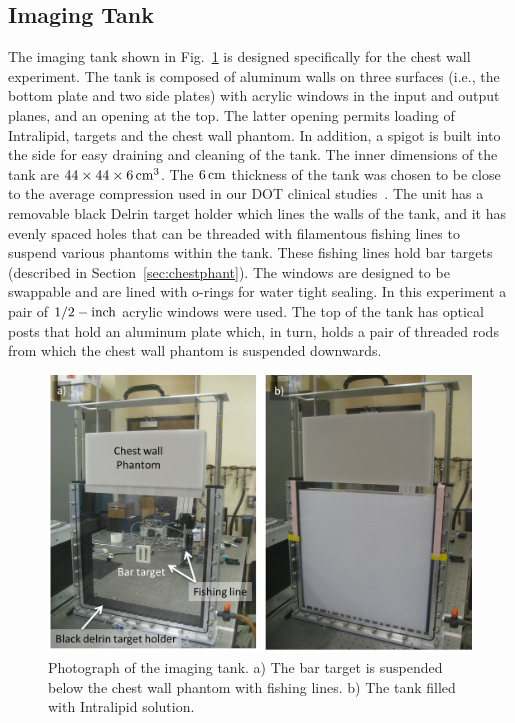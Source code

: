 \subsection{Imaging Tank}
The imaging tank shown in Fig.~\ref{fig:chestwalltank} is designed specifically for the chest wall experiment. The tank is composed of aluminum walls on three surfaces (i.e., the bottom plate and two side plates) with acrylic windows in the input and output planes, and an opening at the top. The latter opening permits loading of Intralipid, targets and the chest wall phantom. In addition, a spigot is built into the side for easy draining and cleaning of the tank. The inner dimensions of the tank are $44\times 44\times 6\,{\rm cm}^3$. The $6\,{\rm cm}$ thickness of the tank was chosen to be close to the average compression used in our DOT clinical studies~\cite{Choe2009, Culver2003}. The unit has a removable black Delrin target holder which lines the walls of the tank, and it has evenly spaced holes that can be threaded with filamentous fishing lines to suspend various phantoms within the tank. These fishing lines hold bar targets (described in Section~\ref{sec:chestphant}). The windows are designed to be swappable and are lined with o-rings for water tight sealing. In this experiment a pair of $1/2-{\rm inch}$ acrylic windows were used. The top of the tank has optical posts that hold an aluminum plate which, in turn, holds a pair of threaded rods from which the chest wall phantom is suspended downwards.
\begin{figure}[h]
\centering\includegraphics[width=14cm]{./figures/3_Chestwall/chestwalltank.png}
\caption[Photograph of the chest wall imaging tank]{Photograph of the imaging tank. a) The bar target is suspended below the chest wall phantom with fishing lines. b) The tank filled with Intralipid solution.}
\label{fig:chestwalltank}
\end{figure}

